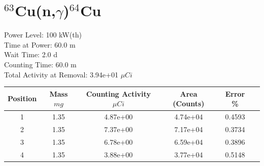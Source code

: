 \newpage

\section*{ $^{63}$Cu(n,$\gamma$)$^{64}$Cu }

Power Level: 100 kW(th) \\
Time at Power: 60.0 m \\
Wait Time:  2.0 d \\
Counting Time: 60.0 m \\
Total Activity at Removal: 3.94e+01 $\mu Ci$

\begin{table}[h]
\centering
\begin{tabular}{ |c|c|c|c|c|c| }
 \hline
 Position & Mass $mg$ & Counting Activity $\mu Ci$ & Area (Counts) & Error \% \\
 \hline 
 1 & 1.35 & 4.87e+00 & 4.74e+04 & 0.4593 \\ 
\hline
 2 & 1.35 & 7.37e+00 & 7.17e+04 & 0.3734 \\ 
\hline
 3 & 1.35 & 6.78e+00 & 6.59e+04 & 0.3896 \\ 
\hline
 4 & 1.35 & 3.88e+00 & 3.77e+04 & 0.5148 \\ 
\hline
\end{tabular}
\end{table}

